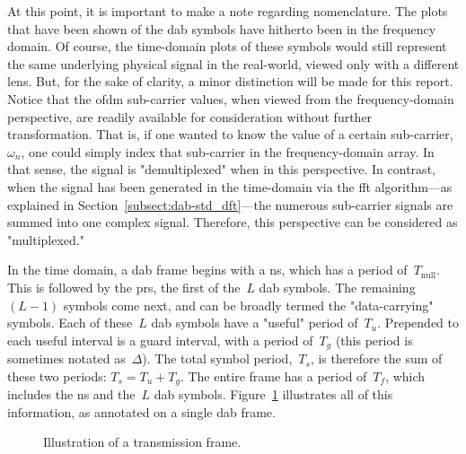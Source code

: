 \documentclass[class=report,11pt,crop=false]{standalone}
\begin{document}
At this point, it is important to make a note regarding nomenclature. The plots that have been shown of the \gls{dab} symbols have hitherto been in the frequency domain. Of course, the time-domain plots of these symbols would still represent the same underlying physical signal in the real-world, viewed only with a different lens. But, for the sake of clarity, a minor distinction will be made for this report. Notice that the \gls{ofdm} sub-carrier values, when viewed from the frequency-domain perspective, are readily available for consideration without further transformation. That is, if one wanted to know the value of a certain sub-carrier, \(\omega_n\), one could simply index that sub-carrier in the frequency-domain array. In that sense, the signal is "demultiplexed" when in this perspective. In contrast, when the signal has been generated in the time-domain via the \gls{fft} algorithm---as explained in Section~\ref{subsect:dab-std_dft}---the numerous sub-carrier signals are summed into one complex signal. Therefore, this perspective can be considered as "multiplexed."


In the time domain, a \gls{dab} frame begins with a \gls{ns}, which has a period of~\(T_\mathrm{null}\). This is followed by the \gls{prs}, the first of the~\(L\) \gls{dab} symbols. The remaining~\((L-1)\) symbols come next, and can be broadly termed the "data-carrying" symbols. Each of these~\(L\) \gls{dab} symbols have a "useful" period of~\(T_u\). Prepended to each useful interval is a guard interval, with a period of~\(T_g\) (this period is sometimes notated as~\(\Delta\)). The total symbol period,~\(T_s\), is therefore the sum of these two periods: \(T_s = T_u + T_g\). The entire frame has a period of~\(T_f\), which includes the \gls{ns} and the~\(L\) \gls{dab} symbols. Figure~\ref{fig:transmission-frame-illustration} illustrates all of this information, as annotated on a single \gls{dab} frame.

\begin{figure}[htbp]
    \centering
    \captionsetup{type=figure}
    \def\svgwidth{1\linewidth}
    { %
    \scriptsize
    }
    \caption{Illustration of a  transmission frame.}
    \label{fig:transmission-frame-illustration}
\end{figure}
\end{document}
